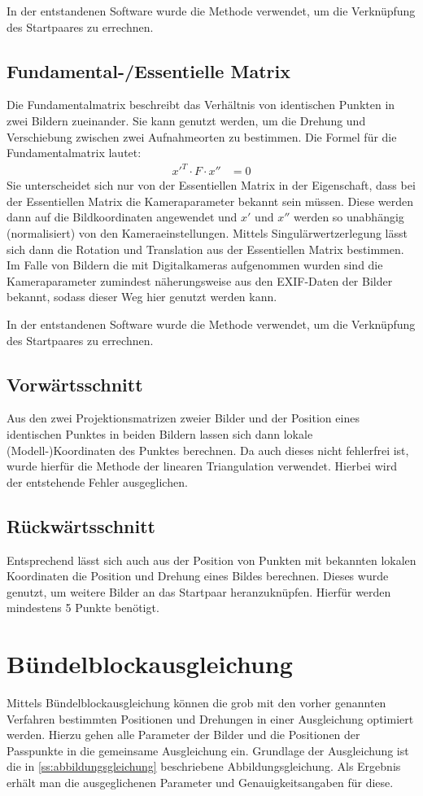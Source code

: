 \documentclass[./00_PhotoBox.tex]{subfiles}
\begin{document}
In der entstandenen Software wurde die Methode verwendet, um die Verknüpfung des Startpaares zu errechnen.

\subsection{Fundamental-/Essentielle Matrix}
Die Fundamentalmatrix beschreibt das Verhältnis von identischen Punkten in zwei Bildern zueinander. Sie kann genutzt werden, um die Drehung und Verschiebung zwischen zwei Aufnahmeorten zu bestimmen. Die Formel für die Fundamentalmatrix lautet:
\begin{align}
    x'^T \cdot F \cdot x'' & = 0
\end{align}
Sie unterscheidet sich nur von der Essentiellen Matrix in der Eigenschaft, dass bei der Essentiellen Matrix die Kameraparameter bekannt sein müssen. Diese werden dann auf die Bildkoordinaten angewendet und $x'$ und $x''$ werden so unabhängig (normalisiert) von den Kameraeinstellungen. Mittels Singulärwertzerlegung lässt sich dann die Rotation und Translation aus der Essentiellen Matrix bestimmen. Im Falle von Bildern die mit Digitalkameras aufgenommen wurden sind die Kameraparameter zumindest näherungsweise aus den EXIF-Daten der Bilder bekannt, sodass dieser Weg hier genutzt werden kann. \citep[S. 257]{hartley}

In der entstandenen Software wurde die Methode verwendet, um die Verknüpfung des Startpaares zu errechnen.

\subsection{Vorwärtsschnitt}
Aus den zwei Projektionsmatrizen zweier Bilder und der Position eines identischen Punktes in beiden Bildern lassen sich dann lokale (Modell-)Koordinaten des Punktes berechnen. Da auch dieses nicht fehlerfrei ist, wurde hierfür die Methode der linearen Triangulation verwendet. Hierbei wird der entstehende Fehler ausgeglichen. \citep[S.312]{hartley}

\subsection{Rückwärtsschnitt}
Entsprechend lässt sich auch aus der Position von Punkten mit bekannten lokalen Koordinaten die Position und Drehung eines Bildes berechnen. Dieses wurde genutzt, um weitere Bilder an das Startpaar heranzuknüpfen. Hierfür werden mindestens 5 Punkte benötigt. \citep[S. 533ff]{hartley}


\section{Bündelblockausgleichung}
Mittels Bündelblockausgleichung können die grob mit den vorher genannten Verfahren bestimmten Positionen und Drehungen in einer Ausgleichung optimiert werden. Hierzu gehen alle Parameter der Bilder und die Positionen der Passpunkte in die gemeinsame Ausgleichung ein. Grundlage der Ausgleichung ist die in \autoref{ss:abbildungsgleichung} beschriebene Abbildungsgleichung. Als Ergebnis erhält man die ausgeglichenen Parameter und Genauigkeitsangaben für diese. \citep[S. 340]{luhmann4}

\biblio
\end{document}

